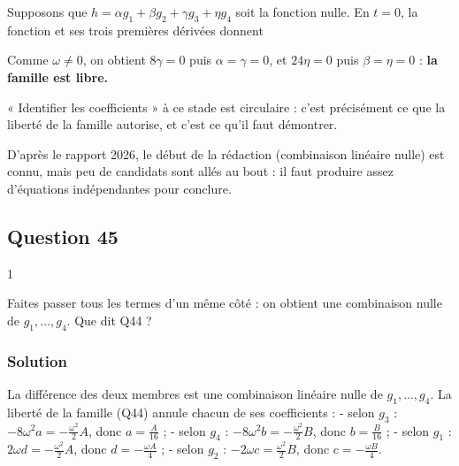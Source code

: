 \documentclass[11pt,a4paper]{article}
\newcommand{\equationajustee}[1]{%
  \sbox{\boiteequation}{$\displaystyle #1$}%
  \ifdim\wd\boiteequation>\linewidth
    \[\resizebox{\linewidth}{!}{\usebox{\boiteequation}}\]%
  \else
    \[#1\]%
  \fi}
\begin{document}
Supposons que \(h=\alpha g_1+\beta g_2+\gamma g_3+\eta g_4\) soit la fonction nulle. En \(t=0\), la fonction et ses trois premières dérivées donnent

\equationajustee{\begin{aligned}
\alpha+\gamma&=0\\
\omega(\beta+3\eta)&=0\\
-\omega^2(\alpha+9\gamma)&=0\\
-\omega^3(\beta+27\eta)&=0
\end{aligned}}

Comme \(\omega\neq0\), on obtient \(8\gamma=0\) puis \(\alpha=\gamma=0\), et \(24\eta=0\) puis \(\beta=\eta=0\) : \textbf{la famille est libre.}

\begin{piege}

« Identifier les coefficients » à ce stade est circulaire : c'est précisément ce que la liberté de la famille autorise, et c'est ce qu'il faut démontrer.

\end{piege}

\begin{jury}

D'après le rapport 2026, le début de la rédaction (combinaison linéaire nulle) est connu, mais peu de candidats sont allés au bout : il faut produire assez d'équations indépendantes pour conclure.

\end{jury}

\hypertarget{question-45}{%
\subsection{Question 45}\label{question-45}}

\begin{indication}{1}

Faites passer tous les termes d'un même côté : on obtient une combinaison nulle de \(g_1,\dots,g_4\). Que dit Q44 ?

\end{indication}

\hypertarget{solution-44}{%
\subsubsection{Solution}\label{solution-44}}

La différence des deux membres est une combinaison linéaire nulle de \(g_1,\dots,g_4\). La liberté de la famille (Q44) annule chacun de ses coefficients :
- selon \(g_3\) : \(-8\omega^2a=-\frac{\omega^2}2A\), donc \(a=\frac A{16}\) ;
- selon \(g_4\) : \(-8\omega^2b=-\frac{\omega^2}2B\), donc \(b=\frac B{16}\) ;
- selon \(g_1\) : \(2\omega d=-\frac{\omega^2}2A\), donc \(d=-\frac{\omega A}4\) ;
- selon \(g_2\) : \(-2\omega c=\frac{\omega^2}2B\), donc \(c=-\frac{\omega B}4\).
\end{document}
